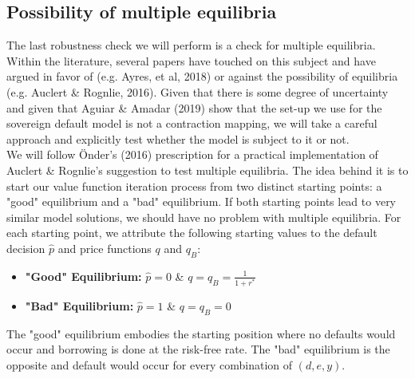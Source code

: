 \subsection{Possibility of multiple equilibria}
The last robustness check we will perform is a check for multiple equilibria. Within the literature, several papers have touched on this subject and have argued in favor of (e.g. Ayres, et al, 2018) or against the possibility of equilibria (e.g. Auclert \& Rognlie, 2016). Given that there is some degree of uncertainty and given that Aguiar \& Amadar (2019) show that the set-up we use for the sovereign default model is not a contraction mapping, we will take a careful approach and explicitly test whether the model is subject to it or not.\\
\clearpage
We will follow Önder's (2016) prescription for a practical implementation of Auclert \& Rognlie's suggestion to test multiple equilibria. The idea behind it is to start our value function iteration process from two distinct starting points: a "good" equilibrium and a "bad" equilibrium. If both starting points lead to very similar model solutions, we should have no problem with multiple equilibria. For each starting point, we attribute the following starting values to the default decision $\hat{p}$ and price functions $q$ and $q_B$:
\begin{itemize}
    \item \textbf{"Good" Equilibrium:} $\hat{p} = 0$ \& $q = q_B = \frac{1}{1+r^*}$
    \item \textbf{"Bad" Equilibrium:} $ \hat{p} = 1$ \& $q = q_B = 0$
\end{itemize}
The "good" equilibrium embodies the starting position where no defaults would occur and borrowing is done at the risk-free rate. The "bad" equilibrium is the opposite and default would occur for every combination of $(d,e,y)$.\\    

